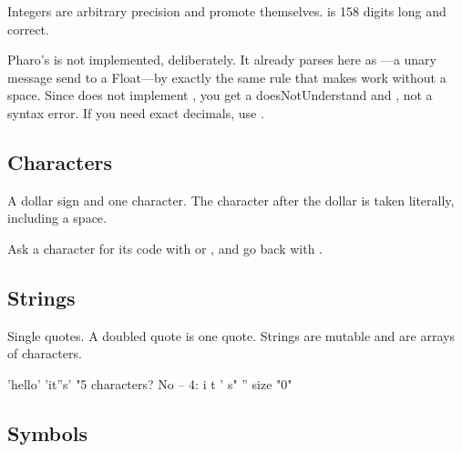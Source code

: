 Integers are arbitrary precision and promote themselves.  is
158 digits long and correct.

\begin{stnote}
Pharo's  is not implemented, deliberately. It already parses here
as ---a unary message send to a Float---by exactly the same rule
that makes  work without a space. Since  does not
implement , you get a doesNotUnderstand and , not a syntax
error. If you need exact decimals, use .
\end{stnote}

\subsection{Characters}

A dollar sign and one character. The character after the dollar is taken
literally, including a space.


Ask a character for its code with  or , and go
back with .


\subsection{Strings}

Single quotes. A doubled quote is one quote. Strings are mutable and are
arrays of characters.

\begin{st}
'hello'
'it''s'             "5 characters?  No -- 4: i t ' s"
'' size             "0"
\end{st}

\subsection{Symbols}


